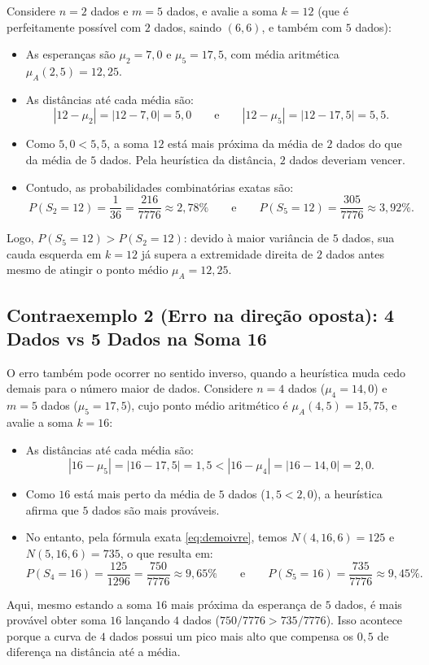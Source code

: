 \documentclass[11pt,a4paper]{article}
\theoremstyle{definition}
\theoremstyle{remark}
\begin{document}
Considere $n = 2$ dados e $m = 5$ dados, e avalie a soma $k = 12$ (que é perfeitamente possível com $2$ dados, saindo $(6,6)$, e também com $5$ dados):
\begin{itemize}[topsep=0.2em, itemsep=0.15em]
    \item As esperanças são $\mu_2 = 7{,}0$ e $\mu_5 = 17{,}5$, com média aritmética $\mu_A(2,5) = 12{,}25$.
    \item As distâncias até cada média são:
    \[
    |12 - \mu_2| = |12 - 7{,}0| = 5{,}0 \qquad \text{e} \qquad |12 - \mu_5| = |12 - 17{,}5| = 5{,}5.
    \]
    \item Como $5{,}0 < 5{,}5$, a soma $12$ está mais próxima da média de $2$ dados do que da média de $5$ dados. Pela heurística da distância, $2$ dados deveriam vencer.
    \item Contudo, as probabilidades combinatórias exatas são:
    \[
    P(S_2 = 12) = \frac{1}{36} = \frac{216}{7776} \approx 2{,}78\%
    \qquad \text{e} \qquad
    P(S_5 = 12) = \frac{305}{7776} \approx 3{,}92\%.
    \]
\end{itemize}
Logo, $P(S_5 = 12) > P(S_2 = 12)$: devido à maior variância de $5$ dados, sua cauda esquerda em $k = 12$ já supera a extremidade direita de $2$ dados antes mesmo de atingir o ponto médio $\mu_A = 12{,}25$.

\subsection{Contraexemplo 2 (Erro na direção oposta): 4 Dados vs 5 Dados na Soma 16}

O erro também pode ocorrer no sentido inverso, quando a heurística muda cedo demais para o número maior de dados. Considere $n = 4$ dados ($\mu_4 = 14{,}0$) e $m = 5$ dados ($\mu_5 = 17{,}5$), cujo ponto médio aritmético é $\mu_A(4,5) = 15{,}75$, e avalie a soma $k = 16$:
\begin{itemize}[topsep=0.2em, itemsep=0.15em]
    \item As distâncias até cada média são:
    \[
    |16 - \mu_5| = |16 - 17{,}5| = 1{,}5 < |16 - \mu_4| = |16 - 14{,}0| = 2{,}0.
    \]
    \item Como $16$ está mais perto da média de $5$ dados ($1{,}5 < 2{,}0$), a heurística afirma que $5$ dados são mais prováveis.
    \item No entanto, pela fórmula exata \eqref{eq:demoivre}, temos $N(4, 16, 6) = 125$ e $N(5, 16, 6) = 735$, o que resulta em:
    \[
    P(S_4 = 16) = \frac{125}{1296} = \frac{750}{7776} \approx 9{,}65\%
    \qquad \text{e} \qquad
    P(S_5 = 16) = \frac{735}{7776} \approx 9{,}45\%.
    \]
\end{itemize}
Aqui, mesmo estando a soma $16$ mais próxima da esperança de $5$ dados, é mais provável obter soma $16$ lançando $4$ dados ($750/7776 > 735/7776$). Isso acontece porque a curva de $4$ dados possui um pico mais alto que compensa os $0{,}5$ de diferença na distância até a média.
\end{document}
